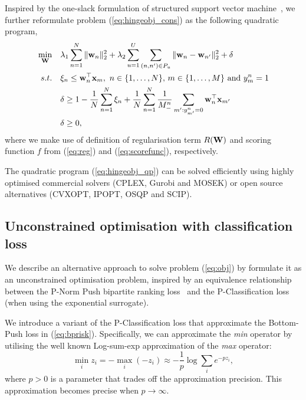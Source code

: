 Inspired by the one-slack formulation of structured support vector machine~\cite{joachims2009cutting},
we further reformulate problem (\ref{eq:hingeobj_cons}) as the following quadratic program,
\begin{equation}
\label{eq:hingeobj_qp}
\begin{aligned}
\min_{\mathbf{W}} \quad & \lambda_1 \sum_{n=1}^N \| \mathbf{w}_n \|_2^2 + \lambda_2 \sum_{u=1}^U \sum_{(n, n') \in P_u} \| \mathbf{w}_n - \mathbf{w}_{n'} \|_2^2 + \delta \\
s.t. \quad 
& \xi_n \le \mathbf{w}_n^\top \mathbf{x}_m, \ n \in \{1,\dots,N\}, \, m \in \{1,\dots,M\} \ \mathrm{and} \ y_m^n = 1 \\
& \delta \ge 1 - \frac{1}{N} \sum_{n=1}^N \xi_n + \frac{1}{N} \sum_{n=1}^N \frac{1}{M_-^n} \sum_{m': y_{m'}^n = 0} \mathbf{w}_n^\top \mathbf{x}_{m'} \\
& \delta \ge 0,
\end{aligned}
\end{equation}
where we make use of definition of regularisation term $R(\mathbf{W})$ and scoring function $f$ from (\ref{eq:reg}) and (\ref{eq:scorefunc}),
respectively.

The quadratic program (\ref{eq:hingeobj_qp}) can be solved efficiently using highly optimised commercial solvers
(\eg CPLEX, Gurobi and MOSEK) or open source alternatives (\eg CVXOPT, IPOPT, OSQP and SCIP).



\subsection{Unconstrained optimisation with classification loss}

We describe an alternative approach to solve problem (\ref{eq:obj}) by formulate it as an unconstrained optimisation problem,
inspired by an equivalence relationship between the P-Norm Push bipartite ranking loss~\cite{rudin2009p} and the 
P-Classification loss~\cite{ertekin2011equivalence} (when using the exponential surrogate).

We introduce a variant of the P-Classification loss that approximate the Bottom-Push loss in (\ref{eq:bprisk}).
Specifically, we can approximate the \emph{min} operator by utilising the well known Log-sum-exp approximation 
of the \emph{max} operator:
\begin{equation}
\label{eq:minappox}
\min_i z_i = -\max_i (-z_i) \approx -\frac{1}{p} \log \sum_i e^{-p z_i},
\end{equation}
where $p > 0$ is a parameter that trades off the approximation precision.
This approximation becomes precise when $p \to \infty$.

